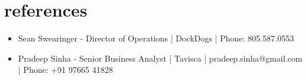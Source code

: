 \documentclass[legalpaper]{twentysecondcv} %
\begin{document}








\newpage %

\makeprofile %




\section{references}


   \begin{itemize}
	\item Sean Swearinger - Director of Operations | DockDogs | Phone: 805.587.0553
    \item Pradeep Sinha - Senior Business Analyst | Tavisca | pradeep.sinha@gmail.com | Phone: +91 97665 41828
\end{itemize}
\end{document}
